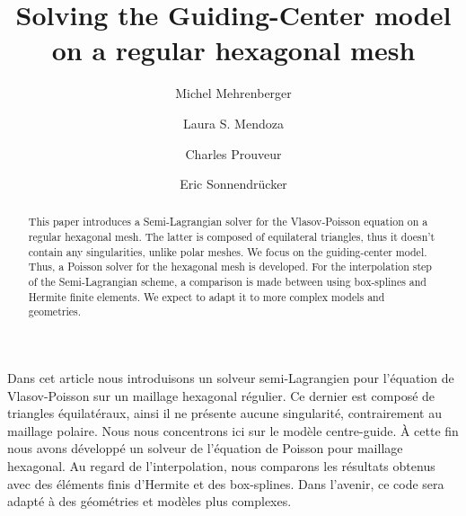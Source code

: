 \documentclass[proc]{edpsmath}
\begin{document}

\title{Solving the Guiding-Center model\\on a regular hexagonal mesh}%
%
\author{Michel Mehrenberger} \address{IRMA, Universit\'e de Strasbourg, 7, rue Ren\'e Descartes, 67084 Strasbourg \& INRIA-Nancy Grand-Est, projet TONUS, 
}
\author{Laura S. Mendoza} \address{Max-Planck-Institut f\"{u}r Plasmaphysik, Boltzmannstr. 2, D-85748 Garching, Germany. } 
\author{Charles Prouveur}\address{Universit\'e de Lyon, UMR5208, Institut Camille Jordan,
43 boulevard 11 novembre 1918, F-69622 Villeurbanne cedex, France.  }
\author{Eric Sonnendr\"{u}cker}
%
%


\begin{abstract} 
This paper introduces a Semi-Lagrangian solver for the Vlasov-Poisson equation on a regular hexagonal mesh. The latter is composed of equilateral triangles, thus it doesn't contain any singularities, unlike polar meshes. We focus on the guiding-center model. Thus, a Poisson solver for the hexagonal mesh is developed. For the interpolation step of the Semi-Lagrangian scheme, a comparison is made between using box-splines and Hermite finite elements. We expect to adapt it to more complex models and geometries.
\end{abstract}

\begin{resume} 
Dans cet article nous introduisons un solveur semi-Lagrangien pour l'\'equation de Vlasov-Poisson sur un maillage hexagonal r\'egulier. Ce dernier est compos\'e de triangles \'equilat\'eraux, ainsi il ne pr\'esente aucune singularit\'e, contrairement au maillage polaire. Nous nous concentrons ici sur le mod\`ele centre-guide. \`A cette fin nous avons d\'evelopp\'e un solveur de l'\'equation de Poisson pour maillage hexagonal. Au regard de l'interpolation, nous comparons les r\'esultats obtenus avec des \'el\'ements finis d'Hermite et des box-splines.   Dans l'avenir, ce code sera adapt\'e \`a des g\'eom\'etries et mod\`eles plus complexes.  
\end{resume}
\end{document}
